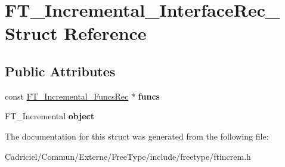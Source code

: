 \hypertarget{struct_f_t___incremental___interface_rec__}{}\section{F\+T\+\_\+\+Incremental\+\_\+\+Interface\+Rec\+\_\+ Struct Reference}
\label{struct_f_t___incremental___interface_rec__}
\subsection*{Public Attributes}
\begin{DoxyCompactItemize}
\item 
const \hyperlink{struct_f_t___incremental___funcs_rec__}{F\+T\+\_\+\+Incremental\+\_\+\+Funcs\+Rec} $\ast$ {\bfseries funcs}\hypertarget{struct_f_t___incremental___interface_rec___acd254ae2bdd80b4c9218a484c6bc2a41}{}\label{struct_f_t___incremental___interface_rec___acd254ae2bdd80b4c9218a484c6bc2a41}

\item 
F\+T\+\_\+\+Incremental {\bfseries object}\hypertarget{struct_f_t___incremental___interface_rec___ae4f527f53465ff84ad01b484fe721a88}{}\label{struct_f_t___incremental___interface_rec___ae4f527f53465ff84ad01b484fe721a88}

\end{DoxyCompactItemize}


The documentation for this struct was generated from the following file\+:\begin{DoxyCompactItemize}
\item 
Cadriciel/\+Commun/\+Externe/\+Free\+Type/include/freetype/ftincrem.\+h\end{DoxyCompactItemize}
